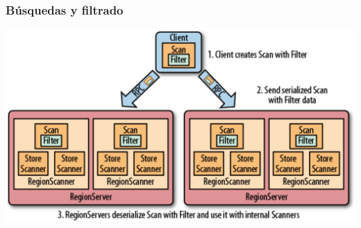 \documentclass[14pt]{beamer}
\begin{document}
\begin{frame}
  \frametitle{Búsquedas y filtrado}
  \includegraphics[width=\textwidth]{img/filter-region-server}
\end{frame}







\end{document}
